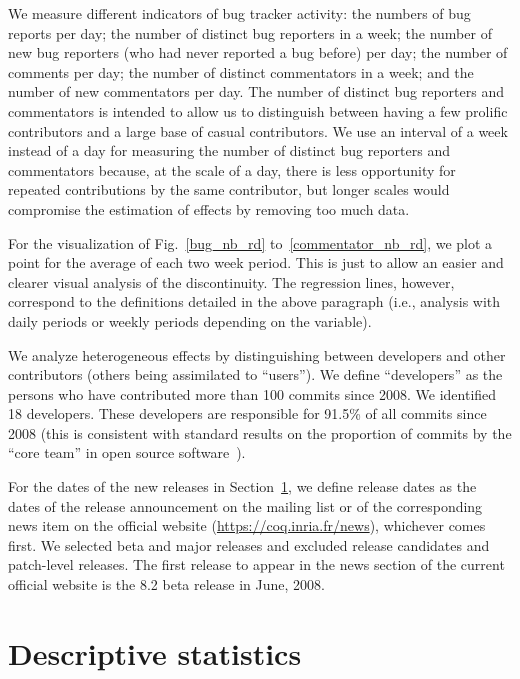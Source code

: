 \documentclass[conference]{IEEEtran}
\begin{document}
We measure different indicators of bug tracker activity: the numbers of bug reports per day; the number of distinct bug reporters in a week; the number of new bug reporters (who had never reported a bug before) per day; the number of comments per day; the number of distinct commentators in a week; and the number of new commentators per day. The number of distinct bug reporters and commentators is intended to allow us to distinguish between having a few prolific contributors and a large base of casual contributors. We use an interval of a week instead of a day for measuring the number of distinct bug reporters and commentators because, at the scale of a day, there is less opportunity for repeated contributions by the same contributor, but longer scales would compromise the estimation of effects by removing too much data.

For the visualization of Fig.~\ref{bug_nb_rd} to~\ref{commentator_nb_rd}, we plot a point for the average of each two week period. This is just to allow an easier and clearer visual analysis of the discontinuity. The regression lines, however, correspond to the definitions detailed in the above paragraph (i.e., analysis with daily periods or weekly periods depending on the variable).

We analyze heterogeneous effects by distinguishing between developers and other contributors (others being assimilated to ``users''). We define ``developers'' as the persons who have contributed more than 100 commits since 2008. We identified 18 developers. These developers are responsible for 91.5\% of all commits since 2008 (this is consistent with standard results on the proportion of commits by the ``core team'' in open source software~\cite{robles2009evolution}).

For the dates of the new releases in Section~\ref{descriptive-stats}, we define release dates as the dates of the release announcement on the mailing list or of the corresponding news item on the official website (\url{https://coq.inria.fr/news}), whichever comes first. We selected beta and major releases and excluded release candidates and patch-level releases. The first release to appear in the news section of the current official website is the 8.2 beta release in June, 2008.

\section{Descriptive statistics}
\label{descriptive-stats}
\end{document}
